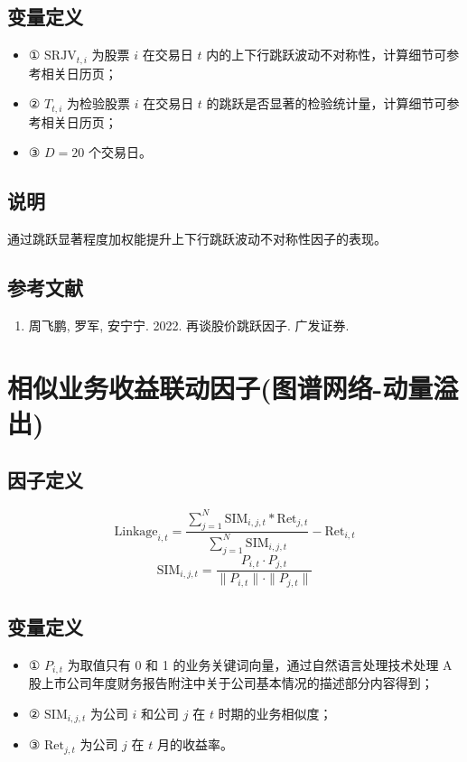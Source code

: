\documentclass{article}
\begin{document}
\subsection{变量定义}
\begin{itemize}
    \item ① \( \mathrm{SRJV}_{t,i} \) 为股票 \( i \) 在交易日 \( t \) 内的上下行跳跃波动不对称性，计算细节可参考相关日历页；
    \item ② \( T_{t,i} \) 为检验股票 \( i \) 在交易日 \( t \) 的跳跃是否显著的检验统计量，计算细节可参考相关日历页；
    \item ③ \( D = 20 \) 个交易日。
\end{itemize}

\subsection{说明}
通过跳跃显著程度加权能提升上下行跳跃波动不对称性因子的表现。

\subsection{参考文献}
\begin{enumerate}
    \item 周飞鹏, 罗军, 安宁宁. 2022. 再谈股价跳跃因子. 广发证券.
\end{enumerate}

\section{相似业务收益联动因子(图谱网络-动量溢出)}

\subsection{因子定义}
\begin{equation}
    \mathrm{Linkage}_{i,t} = \frac{\sum_{j=1}^N \mathrm{SIM}_{i,j,t} * \mathrm{Ret}_{j,t}}{\sum_{j=1}^N \mathrm{SIM}_{i,j,t}} - \mathrm{Ret}_{i,t}
\end{equation}
\begin{equation}
    \mathrm{SIM}_{i,j,t} = \frac{P_{i,t} \cdot P_{j,t}}{\|P_{i,t}\| \cdot \|P_{j,t}\|}
\end{equation}

\subsection{变量定义}
\begin{itemize}
    \item ① \( P_{i,t} \) 为取值只有 0 和 1 的业务关键词向量，通过自然语言处理技术处理 A 股上市公司年度财务报告附注中关于公司基本情况的描述部分内容得到；
    \item ② \( \mathrm{SIM}_{i,j,t} \) 为公司 \( i \) 和公司 \( j \) 在 \( t \) 时期的业务相似度；
    \item ③ \( \mathrm{Ret}_{j,t} \) 为公司 \( j \) 在 \( t \) 月的收益率。
\end{itemize}
\end{document}
